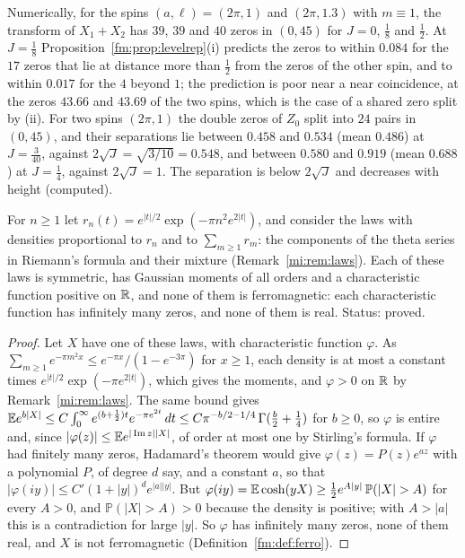 Numerically, for the spins $(a,\ell)=(2\pi,1)$ and $(2\pi,1.3)$ with $m\equiv1$, the transform of $X_1+X_2$ has $39$, $39$ and $40$ zeros in $(0,45)$ for $J=0$, $\frac18$ and $\frac12$. At $J=\frac18$ Proposition~\ref{fm:prop:levelrep}(i) predicts the zeros to within $0.084$ for the $17$ zeros that lie at distance more than $\frac12$ from the zeros of the other spin, and to within $0.017$ for the $4$ beyond $1$; the prediction is poor near a near coincidence, at the zeros $43.66$ and $43.69$ of the two spins, which is the case of a shared zero split by (ii). For two spins $(2\pi,1)$ the double zeros of $Z_0$ split into $24$ pairs in $(0,45)$, and their separations lie between $0.458$ and $0.534$ (mean $0.486$) at $J=\frac3{40}$, against $2\sqrt J=\sqrt{3/10}=0.548$, and between $0.580$ and $0.919$ (mean $0.688$) at $J=\frac14$, against $2\sqrt J=1$. The separation is below $2\sqrt J$ and decreases with height (computed).

\begin{proposition}\label{fm:prop:nocomponent}
For $n\ge1$ let $r_n(t)=e^{|t|/2}\exp(-\pi n^2e^{2|t|})$, and consider the laws with densities proportional to $r_n$ and to $\sum_{m\ge1}r_m$: the components of the theta series in Riemann's formula and their mixture (Remark~\ref{mi:rem:laws}). Each of these laws is symmetric, has Gaussian moments of all orders and a characteristic function positive on $\mathbb{R}$, and none of them is ferromagnetic: each characteristic function has infinitely many zeros, and none of them is real. Status: proved.
\end{proposition}

\begin{proof}
Let $X$ have one of these laws, with characteristic function $\varphi$. As $\sum_{m\ge1}e^{-\pi m^2x}\le e^{-\pi x}/(1-e^{-3\pi})$ for $x\ge1$, each density is at most a constant times $e^{|t|/2}\exp(-\pi e^{2|t|})$, which gives the moments, and $\varphi>0$ on $\mathbb{R}$ by Remark~\ref{mi:rem:laws}. The same bound gives $\mathbb{E} e^{b|X|}\le C\int_0^\infty e^{(b+\frac12)t}e^{-\pi e^{2t}}\,dt\le C\pi^{-b/2-1/4}\,\Gamma(\tfrac b2+\tfrac14)$ for $b\ge0$, so $\varphi$ is entire and, since $|\varphi(z)|\le\mathbb{E} e^{|\operatorname{Im} z||X|}$, of order at most one by Stirling's formula. If $\varphi$ had finitely many zeros, Hadamard's theorem would give $\varphi(z)=P(z)e^{az}$ with a polynomial $P$, of degree $d$ say, and a constant $a$, so that $|\varphi(iy)|\le C'(1+|y|)^de^{|a||y|}$. But $\varphi(iy)=\E\cosh(yX)\ge\frac12e^{A|y|}\,\mathbb P(|X|>A)$ for every $A>0$, and $\mathbb P(|X|>A)>0$ because the density is positive; with $A>|a|$ this is a contradiction for large $|y|$. So $\varphi$ has infinitely many zeros, none of them real, and $X$ is not ferromagnetic (Definition~\ref{fm:def:ferro}).
\end{proof}

